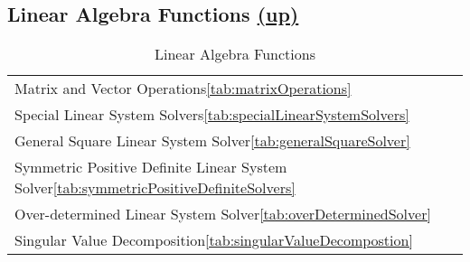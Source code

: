\subsection*{Linear Algebra Functions \hyperlink{VSIPspecHead}{(up)}} 
\begin{table}[H]
\hypertarget{linearAlgebraFunctions}{}
\caption{Linear Algebra Functions}
\label{tab:linearAlgebraFunctions}
\begin{center}
\begin{tabular}{l}
Matrix and Vector Operations\ref{tab:matrixOperations}\\
Special Linear System Solvers\ref{tab:specialLinearSystemSolvers}\\
General Square Linear System Solver\ref{tab:generalSquareSolver}\\
Symmetric Positive Definite Linear System Solver\ref{tab:symmetricPositiveDefiniteSolvers}\\
Over-determined Linear System Solver\ref{tab:overDeterminedSolver}\\
Singular Value Decomposition\ref{tab:singularValueDecompostion}\\
\end{tabular}
\end{center}
\label{default}
\end{table}%
      
      
